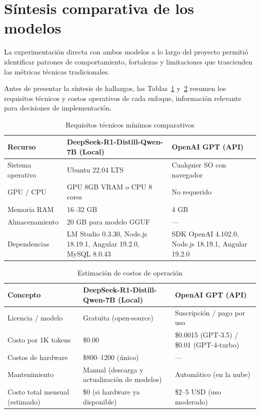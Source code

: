 \documentclass[12pt,a4paper]{report}
\numberwithin{figure}{section}
\begin{document}
\section{Síntesis comparativa de los modelos}
\label{sec:sintesis_comparativa}

La experimentación directa con ambos modelos a lo largo del proyecto permitió identificar patrones de comportamiento, fortalezas y limitaciones que trascienden las métricas técnicas tradicionales.

Antes de presentar la síntesis de hallazgos, las Tablas~\ref{tab:requisitos_tecnicos} y~\ref{tab:costos_operacion} resumen los requisitos técnicos y costos operativos de cada enfoque, información relevante para decisiones de implementación.

\begin{table}[h!]
\centering
\caption{Requisitos técnicos mínimos comparativos}
\label{tab:requisitos_tecnicos}
\renewcommand{\arraystretch}{1.2}
\begin{tabular}{@{}p{4cm}p{5cm}p{5cm}@{}}
\toprule
\textbf{Recurso} & \textbf{DeepSeek-R1-Distill-Qwen-7B (Local)} & \textbf{OpenAI GPT (API)} \\
\midrule
Sistema operativo & Ubuntu 22.04 LTS & Cualquier SO con navegador \\
\midrule
GPU / CPU & GPU 8GB VRAM o CPU 8 cores & No requerido \\
\midrule
Memoria RAM & 16–32 GB & 4 GB \\
\midrule
Almacenamiento & 20 GB para modelo GGUF & — \\
\midrule
Dependencias & LM Studio 0.3.30, Node.js 18.19.1, Angular 19.2.0, MySQL 8.0.43 & SDK OpenAI 4.102.0, Node.js 18.19.1, Angular 19.2.0 \\
\bottomrule
\end{tabular}
\end{table}

\begin{table}[h!]
\centering
\caption{Estimación de costos de operación}
\label{tab:costos_operacion}
\renewcommand{\arraystretch}{1.2}
\begin{tabular}{@{}p{4cm}p{5cm}p{5cm}@{}}
\toprule
\textbf{Concepto} & \textbf{DeepSeek-R1-Distill-Qwen-7B (Local)} & \textbf{OpenAI GPT (API)} \\
\midrule
Licencia / modelo & Gratuita (open-source) & Suscripción / pago por uso \\
\midrule
Costo por 1K tokens & \$0.00 & \$0.0015 (GPT-3.5) / \$0.01 (GPT-4-turbo) \\
\midrule
Costos de hardware & \$800–1200 (único) & — \\
\midrule
Mantenimiento & Manual (descarga y actualización de modelos) & Automático (en la nube) \\
\midrule
Costo total mensual (estimado) & \$0 (si hardware ya disponible) & \$2–5 USD (uso moderado) \\
\bottomrule
\end{tabular}
\end{table}
\end{document}
